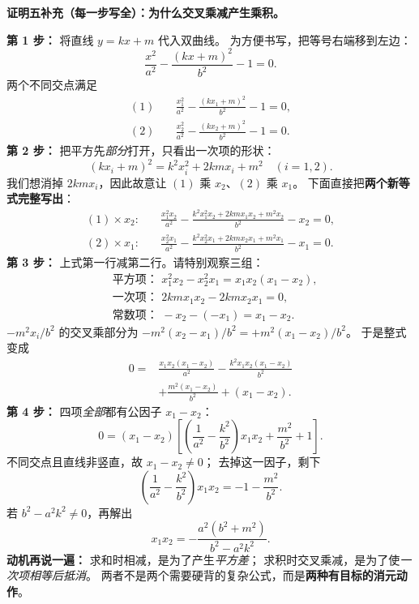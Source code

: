 \begin{proofbox}
\textbf{证明五补充（每一步写全）：为什么交叉乘减产生乘积。}

\textbf{第 1 步：} 将直线 $y=kx+m$ 代入双曲线。
为方便书写，把等号右端移到左边：
\[
 \frac{x^2}{a^2}-\frac{(kx+m)^2}{b^2}-1=0.
\]
两个不同交点满足
\[
\begin{aligned}
 (1)\quad &\frac{x_1^2}{a^2}-\frac{(kx_1+m)^2}{b^2}-1=0,\\
 (2)\quad &\frac{x_2^2}{a^2}-\frac{(kx_2+m)^2}{b^2}-1=0.
\end{aligned}
\]
\textbf{第 2 步：} 把平方先\emph{部分}打开，只看出一次项的形状：
\[
 (kx_i+m)^2=k^2x_i^2+2kmx_i+m^2\quad(i=1,2).
\]
我们想消掉 $2kmx_i$，因此故意让 $(1)$ 乘 $x_2$、$(2)$ 乘 $x_1$。
下面直接把\textbf{两个新等式完整写出}：
\[
\begin{aligned}
 (1)\times x_2:\quad
 &\frac{x_1^2x_2}{a^2}
 -\frac{k^2x_1^2x_2+2kmx_1x_2+m^2x_2}{b^2}
 -x_2=0,\\
 (2)\times x_1:\quad
 &\frac{x_2^2x_1}{a^2}
 -\frac{k^2x_2^2x_1+2kmx_2x_1+m^2x_1}{b^2}
 -x_1=0.
\end{aligned}
\]
\textbf{第 3 步：} 上式第一行减第二行。请特别观察三组：
\[
\begin{aligned}
 &\text{平方项： }x_1^2x_2-x_2^2x_1=x_1x_2(x_1-x_2),\\
 &\text{一次项： }2kmx_1x_2-2kmx_2x_1=0,\\
 &\text{常数项： }-x_2-(-x_1)=x_1-x_2.
\end{aligned}
\]
$-m^2x_i/b^2$ 的交叉乘部分为
$-m^2(x_2-x_1)/b^2=+m^2(x_1-x_2)/b^2$。
于是整式变成
\[
\begin{aligned}
0={}&\frac{x_1x_2(x_1-x_2)}{a^2}
 -\frac{k^2x_1x_2(x_1-x_2)}{b^2}\\
 &+\frac{m^2(x_1-x_2)}{b^2}+(x_1-x_2).
\end{aligned}
\]
\textbf{第 4 步：} 四项\emph{全部}都有公因子 $x_1-x_2$：
\[
0=(x_1-x_2)\left[
 \left(\frac1{a^2}-\frac{k^2}{b^2}\right)x_1x_2
 +\frac{m^2}{b^2}+1\right].
\]
不同交点且直线非竖直，故 $x_1-x_2\ne0$；
去掉这一因子，剩下
\[
\boxed{\left(\frac1{a^2}-\frac{k^2}{b^2}\right)x_1x_2
=-1-\frac{m^2}{b^2}}.
\]
若 $b^2-a^2k^2\ne0$，再解出
\[
\boxed{x_1x_2=-\frac{a^2(b^2+m^2)}{b^2-a^2k^2}}.
\]
\textbf{动机再说一遍：} 求和时相减，是为了产生\emph{平方差}；
求积时交叉乘减，是为了使\emph{一次项相等后抵消}。
两者不是两个需要硬背的复杂公式，而是\textbf{两种有目标的消元动作}。
\end{proofbox}
\clearpage
